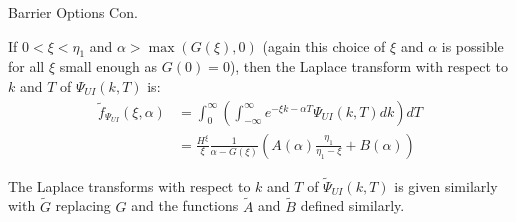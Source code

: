 \documentclass{beamer}
\begin{document}
\begin{frame}{Barrier Options Con.}

    {\footnotesize \footnotesize
    \par  If \(0 < \xi < \eta_1\) and \(\alpha > \max(G(\xi), 0)\) (again this choice of \(\xi\) and \(\alpha\) is possible for 
    all \(\xi\) small enough as \(G(0) = 0\)), then the Laplace transform with respect to \(k\) and \(T\) of \(\Psi_{UI}(k, T)\) is:
     \vspace{1em}
    \begin{align*}
        \tilde{f}_{\Psi_{UI}}(\xi, \alpha) &= \int_0^{\infty} \left( \int_{-\infty}^{\infty} e^{-\xi k - \alpha T} \Psi_{UI}(k, T) dk \right) dT\\
    &= \frac{H^{\xi}}{\xi} \frac{1}{\alpha - G(\xi)} \left( A(\alpha) \frac{\eta_1}{\eta_1 - \xi} + B(\alpha) \right)
    \end{align*}

    \vspace{1em}
    \par  \pause The Laplace transforms with respect to \(k\) and \(T\) of \(\tilde{\Psi}_{UI}(k, T)\) is given 
    similarly with \(\tilde{G}\) replacing \(G\) and the functions \(\tilde{A}\) and \(\tilde{B}\) defined similarly. 
    }
\end{frame}
\end{document}
